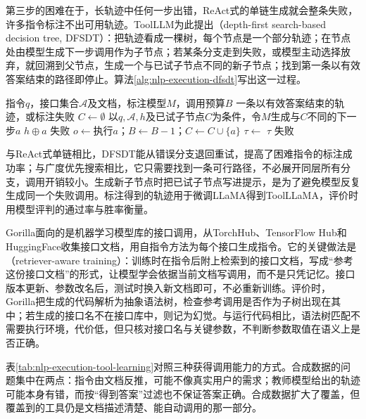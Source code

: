 第三步的困难在于，长轨迹中任何一步出错，ReAct式的单链生成就会整条失败，许多指令标注不出可用轨迹。ToolLLM为此提出（depth-first search-based decision tree, DFSDT）：把轨迹看成一棵树，每个节点是一个部分轨迹；在节点处由模型生成下一步调用作为子节点；若某条分支走到失败，或模型主动选择放弃，就回溯到父节点，生成一个与已试子节点不同的新子节点；找到第一条以有效答案结束的路径即停止。算法\ref{alg:nlp-execution-dfsdt}写出这一过程。

\begin{algorithm}[DFSDT调用轨迹标注]
\label{alg:nlp-execution-dfsdt}
\begin{algorithmic}[1]
\Require 指令$q$，接口集合$\mathcal{A}$及文档，标注模型$M$，调用预算$B$
\Ensure 一条以有效答案结束的轨迹，或标注失败
  \State $C\gets\emptyset$
    \State 以$q,\mathcal{A},h$及已试子节点$C$为条件，令$M$生成与$C$不同的下一步$a$
      \State \Return $h\oplus a$
      \State \Return 失败
    \EndIf
    \State $o\gets$执行$a$；$B\gets B-1$；$C\gets C\cup\{a\}$
    \State $\tau\gets$
      \State \Return $\tau$
    \EndIf
  \EndWhile
  \State \Return 失败
\EndFunction
\State \Return {}
\end{algorithmic}
\end{algorithm}

与ReAct式单链相比，DFSDT能从错误分支退回重试，提高了困难指令的标注成功率；与广度优先搜索相比，它只需要找到一条可行路径，不必展开同层所有分支，调用开销较小。生成新子节点时把已试子节点写进提示，是为了避免模型反复生成同一个失败调用。标注得到的轨迹用于微调LLaMA得到ToolLLaMA，评价时用模型评判的通过率与胜率衡量。

Gorilla面向的是机器学习模型库的接口调用，从TorchHub、TensorFlow Hub和HuggingFace收集接口文档，用自指令方法为每个接口生成指令。它的关键做法是（retriever-aware training）：训练时在指令后附上检索到的接口文档，写成“参考这份接口文档”的形式，让模型学会依据当前文档写调用，而不是只凭记忆。接口版本更新、参数改名后，测试时换入新文档即可，不必重新训练。评价时，Gorilla把生成的代码解析为抽象语法树，检查参考调用是否作为子树出现在其中；若生成的接口名不在接口库中，则记为幻觉。与运行代码相比，语法树匹配不需要执行环境，代价低，但只核对接口名与关键参数，不判断参数取值在语义上是否正确。

表\ref{tab:nlp-execution-tool-learning}对照三种获得调用能力的方式。合成数据的问题集中在两点：指令由文档反推，可能不像真实用户的需求；教师模型给出的轨迹可能本身有错，而按“得到答案”过滤也不保证答案正确。合成数据扩大了覆盖，但覆盖到的工具仍是文档描述清楚、能自动调用的那一部分。

